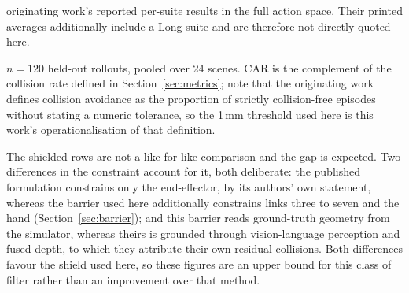 \begin{table}[htbp]
\begin{threeparttable}
\begin{tablenotes}[flushleft]
  originating work's reported per-suite results in the full action space. Their printed averages
  additionally include a Long suite and are therefore not directly quoted here.
\item[b] $n = 120$ held-out rollouts, pooled over 24 scenes. CAR is the complement of the collision
  rate defined in Section~\ref{sec:metrics}; note that the originating work defines collision
  avoidance as the proportion of strictly collision-free episodes without stating a numeric
  tolerance, so the 1\,mm threshold used here is this work's operationalisation of that definition.
\item[c] The shielded rows are not a like-for-like comparison and the gap is expected. Two
  differences in the constraint account for it, both deliberate: the published formulation
  constrains only the end-effector, by its authors' own statement, whereas the barrier used here
  additionally constrains links three to seven and the hand (Section~\ref{sec:barrier}); and this
  barrier reads ground-truth geometry from the simulator, whereas theirs is grounded through
  vision-language perception and fused depth, to which they attribute their own residual
  collisions. Both differences favour the shield used here, so these figures are an upper bound
  for this class of filter rather than an improvement over that method.
\end{tablenotes}
\end{threeparttable}
\end{table}
